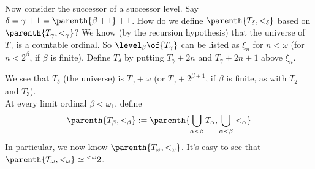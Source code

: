 \begin{boxconstruction}
    Now consider the successor of a successor level. Say $\delta = \gamma + 1 = \parenth{\beta + 1} + 1$. How do we define $\parenth{T_{\delta}, <_{\delta}}$ based on $\parenth{T_{\gamma}, <_{\gamma}}$? We know (by the recursion hypothesis) that the universe of $T_{\gamma}$ is a countable ordinal. So $\level_{\beta}\of{T_{\gamma}}$ can be listed as $\xi_n$ for $n < \omega$ (for $n < 2^{\beta}$, if $\beta$ is finite). Define $T_{\delta}$ by putting $T_{\gamma} + 2n$ and $T_{\gamma} + 2n + 1$ above $\xi_n$.
    \begin{figure}[H]
        \centering
    \end{figure}
    We see that $T_{\delta}$ (the universe) is $T_{\gamma} + \omega$ (or $T_{\gamma} + 2^{\beta + 1}$, if $\beta$ is finite, as with $T_2$ and $T_3$). \\

    At every limit ordinal $\beta < \omega_1$, define
    \begin{align*}
        \parenth{T_{\beta}, <_{\beta}} := \parenth{\bigcup_{\alpha < \beta} T_{\alpha}, \bigcup_{\alpha < \beta} <_{\alpha}}
    \end{align*}
    In particular, we now know $\parenth{T_{\omega}, <_{\omega}}$. It's easy to see that $\parenth{T_{\omega}, <_{\omega}} \simeq {^{<\omega}2}$.


\end{boxconstruction}
